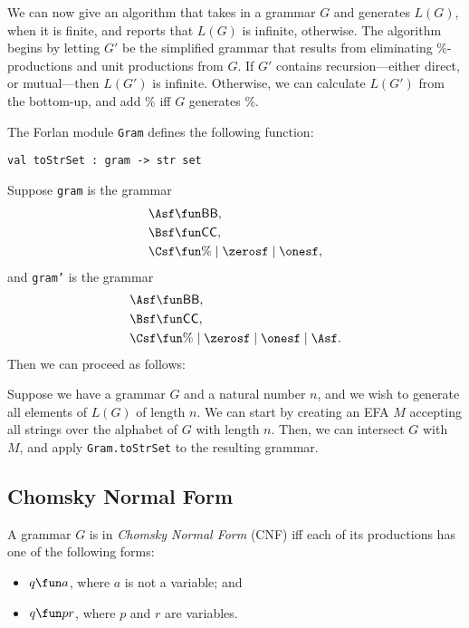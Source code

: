 We can now give an algorithm that takes in a grammar $G$ and generates
$L(G)$, when it is finite, and reports that $L(G)$ is infinite,
otherwise.  The algorithm begins by letting $G'$ be the simplified
grammar that results from eliminating $\%$-productions and unit
productions from $G$.  If $G'$ contains recursion---either direct, or
mutual---then $L(G')$ is infinite.  Otherwise, we can calculate
$L(G')$ from the bottom-up, and add $\%$ iff $G$ generates $\%$.

The Forlan module \texttt{Gram} defines the following function:
\begin{verbatim}
val toStrSet : gram -> str set
\end{verbatim}
Suppose \texttt{gram} is the grammar
\begin{align*}
\Asf &\fun \mathsf{BB}, \\
\Bsf &\fun \mathsf{CC}, \\
\Csf &\fun \% \mid \zerosf \mid \onesf ,
\end{align*}
and
\texttt{gram'} is the grammar
\begin{align*}
\Asf &\fun \mathsf{BB}, \\
\Bsf &\fun \mathsf{CC}, \\
\Csf &\fun \% \mid \zerosf \mid \onesf \mid \Asf .
\end{align*}
Then we can proceed as follows:
  

Suppose we have a grammar $G$ and a natural number $n$, and we wish to
generate all elements of $L(G)$ of length $n$.  We can start by
creating an EFA $M$ accepting all strings over the alphabet of $G$
with length $n$.  Then, we can intersect $G$ with $M$, and apply
\texttt{Gram.toStrSet} to the resulting grammar.

\subsection{Chomsky Normal Form}

A grammar $G$ is in \emph{Chomsky Normal Form} (CNF) iff
each of its productions has one of the following forms:
\begin{itemize}
\item $q\fun a$, where $a$ is not a variable; and

\item $q\fun pr$, where $p$ and $r$ are variables.
\end{itemize}

